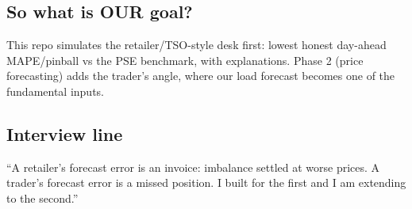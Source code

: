\subsection{So what is OUR goal?}

This repo simulates the retailer/TSO-style desk first: lowest honest
day-ahead MAPE/pinball vs the PSE benchmark, with explanations. Phase 2
(price forecasting) adds the trader's angle, where our load forecast becomes
one of the fundamental inputs.

\subsection{Interview line}

``A retailer's forecast error is an invoice: imbalance settled at worse
prices. A trader's forecast error is a missed position. I built for the
first and I am extending to the second.''
